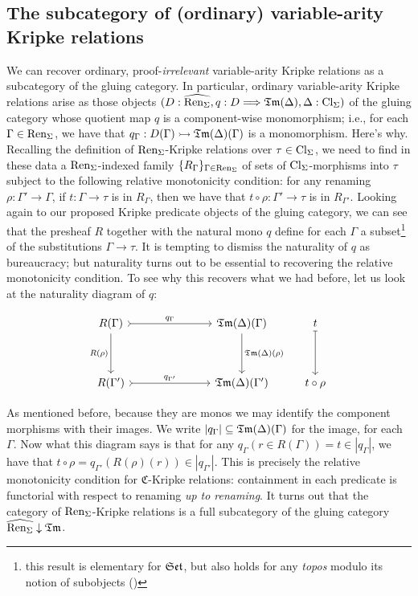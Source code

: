 \documentclass[12pt,twoside]{reedthesis}
\theoremstyle{definition}
\theoremstyle{remark}
\theoremstyle{plain}
\begin{document}
\subsection{The subcategory of (ordinary) variable-arity Kripke relations}
We can recover ordinary, proof-\emph{irrelevant} variable-arity Kripke relations
as a subcategory of the gluing category. In particular, ordinary variable-arity
Kripke relations arise as those objects
\( (D : \widehat{\text{Ren}_\Sigma}, q : D \Longrightarrow \mathfrak{Tm} (\Delta), \Delta : \text{Cl}_\Sigma) \) of the gluing category whose
quotient map $q$ is a component-wise monomorphism; i.e., for each
\( \Gamma \in \text{Ren}_\Sigma \), we have that \( q_{\Gamma} : D(\Gamma) \rightarrowtail \mathfrak{Tm} (\Delta)(\Gamma) \) is a monomorphism.
Here's why. Recalling the definition of $\text{Ren}_\Sigma$-Kripke relations over $\tau \in \text{Cl}_\Sigma$,
we need to find in these data a $\text{Ren}_\Sigma$-indexed family \( \{ R_{\Gamma}\}_{\Gamma \in \text{Ren}_\Sigma}\)
of sets of $\text{Cl}_\Sigma$-morphisms into \( \tau \) subject to the following relative
monotonicity condition: for any renaming \( \rho : \Gamma' \rightarrow \Gamma \), if \( t : \Gamma \rightarrow \tau \) is
in \( R_{\Gamma}\), then we have that \( t \circ \rho : \Gamma' \rightarrow \tau \) is in \( R_{\Gamma'}\). Looking
again to our proposed Kripke predicate objects of the gluing category, we can
see that the presheaf \( R \) together with the natural mono \( q \) define for
each \( \Gamma \) a subset\footnote{this result is elementary for $\mathfrak{Set}$, but also
  holds for any \emph{topos} modulo its notion of subobjects
  (\cite{leinster_informal_2011})} of the substitutions \( \Gamma \rightarrow \tau \). It is
tempting to dismiss the naturality of $q$ as bureaucracy; but naturality turns
out to be essential to recovering the relative monotonicity condition. To see
why this recovers what we had before, let us look at the naturality diagram of
\( q \):

  \[\begin{tikzcd}
      {R (\Gamma)} &&& {\tm(\Delta) (\Gamma)} & t \\
      \\
      {R (\Gamma')} &&& {\tm(\Delta) (\Gamma')} & {t \circ \rho}
      \arrow["{q_{\Gamma}}", from=1-1, to=1-4, rightarrowtail]
      \arrow["{q_{\Gamma'}}", from=3-1, to=3-4, rightarrowtail]
      \arrow["{R (\rho)}"', from=1-1, to=3-1]
      \arrow["{\tm(\Delta) (\rho)}", from=1-4, to=3-4]
      \arrow[from=1-5, to=3-5, mapsto]
    \end{tikzcd}\]

  As mentioned before, because they are monos we may identify the component
  morphisms with their images. We write \( |q_{\Gamma}| \subseteq \mathfrak{Tm}(\Delta)(\Gamma) \) for the image,
  for each \( \Gamma \). Now what this diagram says is that for any
  \( q_{\Gamma }(r \in R(\Gamma)) = t \in |q_{\Gamma}|\), we have that
  \( t \circ \rho = q_{\Gamma'}(R(\rho)(r)) \in |q_{\Gamma'}|\). This is precisely the relative
  monotonicity condition for $\mathfrak{C}$-Kripke relations: containment in
  each predicate is functorial with respect to renaming \emph{up to renaming}.
  It turns out that the category of \(\text{Ren}_\Sigma\)-Kripke relations is a full
  subcategory of the gluing category \( \widehat{\text{Ren}_\Sigma} \downarrow \mathfrak{Tm} \).
\end{document}
